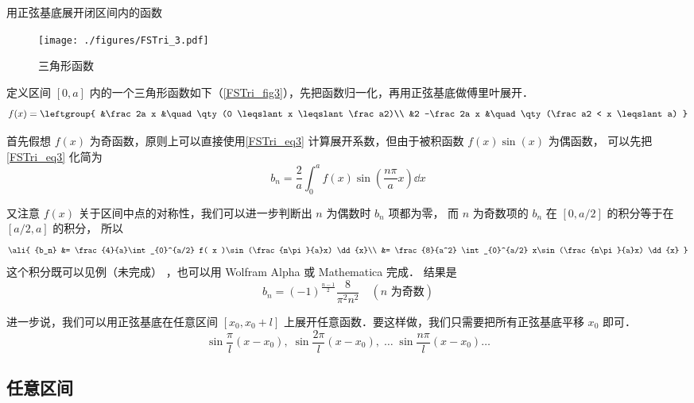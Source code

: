 \begin{example}{用正弦基底展开闭区间内的函数}

\begin{figure}[ht]
\centering
\texttt{[image: ./figures/FSTri\_3.pdf]}
\caption{三角形函数} \label{FSTri_fig3}
\end{figure}

定义区间 $[0,a]$ 内的一个三角形函数如下（\autoref{FSTri_fig3}），先把函数归一化，再用正弦基底做傅里叶展开．
\begin{equation}
f(x) = \leftgroup{
&\frac2a x &\quad \qty(0 \leqslant x \leqslant \frac a2)\\
&2 -\frac2a x &\quad \qty(\frac a2 < x \leqslant a)
}\end{equation}

首先假想 $f(x)$ 为奇函数，原则上可以直接使用\autoref{FSTri_eq3} 计算展开系数，但由于被积函数 $f(x)\sin(x)$ 为偶函数， 可以先把\autoref{FSTri_eq3} 化简为%
\begin{equation}
{b_n} = \frac{2}{a}\int_{0}^a f( x )\sin (\frac{n\pi}{a}x) \dd{x}
\end{equation}

又注意 $f(x)$ 关于区间中点的对称性，我们可以进一步判断出 $n$ 为偶数时 $b_n$ 项都为零， 而 $n$ 为奇数项的 $b_n$ 在 $[0, a/2]$ 的积分等于在 $[a/2, a]$ 的积分， 所以
\begin{equation}
\ali{
{b_n} &= \frac{4}{a}\int_{0}^{a/2} f( x )\sin (\frac{n\pi}{a}x) \dd{x}\\
&= \frac{8}{a^2} \int_{0}^{a/2} x\sin (\frac{n\pi}{a}x) \dd{x}
}\end{equation}
这个积分既可以见例（未完成）
，也可以用 Wolfram Alpha 或 Mathematica 完成．%
结果是
\begin{equation}
b_n = (-1)^{\frac{n-1}{2}} \frac{8}{\pi^2 n^2} \quad (\text{$n$ 为奇数})
\end{equation}
\end{example}
进一步说，我们可以用正弦基底在任意区间 $[x_0,x_0+l]$ 上展开任意函数．要这样做，我们只需要把所有正弦基底平移 $x_0$ 即可．
\begin{equation}
\sin\frac{\pi}{l} (x-x_0),\;   \sin\frac{2\pi}{l} (x-x_0),\;    \dots\;\sin\frac{n\pi}{l} (x-x_0) \dots
\end{equation}

\subsection{任意区间}

